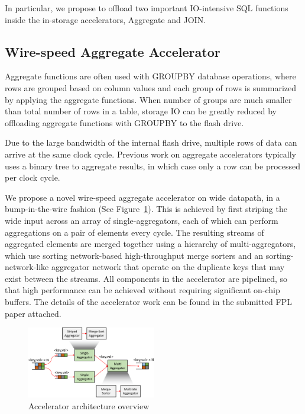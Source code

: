 \documentclass{article}
\begin{document}
In particular, we propose to offload two important IO-intensive SQL functions inside the in-storage accelerators, Aggregate and JOIN.

\subsection{Wire-speed Aggregate Accelerator}
Aggregate functions are often used with GROUPBY database operations, where rows are grouped based on column values and each group of rows is summarized by applying the aggregate functions.
When number of groups are much smaller than total number of rows in a table, storage IO can be greatly reduced by offloading aggregate functions with GROUPBY to the flash drive.

Due to the large bandwidth of the internal flash drive, multiple rows of data can arrive at the same clock cycle.
Previous work on aggregate accelerators typically uses a binary tree to aggregate results, in which case only a row can be processed per clock cycle.

We propose a novel wire-speed aggregate accelerator on wide datapath, in a bump-in-the-wire fashion (See Figure~\ref{fig:arch-overview}).
This is achieved by first striping the wide input across an array of single-aggregators, each of which can perform aggregations on a pair of elements every cycle.
The resulting streams of aggregated elements are merged together using a hierarchy of multi-aggregators, which use sorting network-based high-throughput merge sorters and an sorting-network-like
aggregator network that operate on the duplicate keys that may exist between the streams.
All components in the accelerator are pipelined, so that high performance can be achieved without requiring significant on-chip buffers.
The details of the accelerator work can be found in the submitted FPL paper attached.

\begin{figure}[t]
    \centering
    \includegraphics[page=1, width=0.50\textwidth]{figures/figures-crop.pdf}
    \caption{Accelerator architecture overview}
    \label{fig:arch-overview}
	\vspace{-10pt}
\end{figure}
\end{document}
